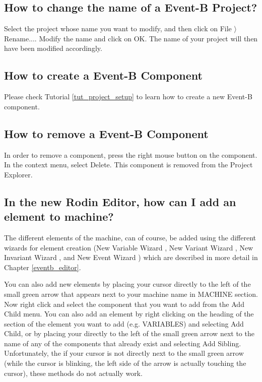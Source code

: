 \subsection{How to change the name of a Event-B Project?}

Select the project whose name you want to modify, and then click on \textsf{File $\rangle$ Rename...}. Modify the name and click on \textsf{OK}. The name of your project will then have been modified accordingly. 

\subsection{How to create a Event-B Component}

Please check Tutorial \ref{tut_project_setup} to learn how to create a new Event-B component.

\subsection{How to remove a Event-B Component}

In order to remove a component, press the right mouse button on the component. In the context menu, select \textsf{Delete}. This component is removed from the \textsf{Project Explorer}. 

\subsection{In the new Rodin Editor, how can I add an element to machine?}

The different elements of the machine, can of course, be added using the different wizards for element creation (New Variable Wizard , New Variant Wizard , New Invariant Wizard , and New Event Wizard ) which are described in more detail in Chapter \ref{eventb_editor}. 

You can also add new elements by placing your cursor directly to the left of the small green arrow that appears next to your machine name in \textsf{MACHINE} section. Now right click and select the component that you want to add from the \textsf{Add Child} menu. You can also add an element by right clicking on the heading of the section of the element you want to add (e.g. \textsf{VARIABLES}) and selecting \textsf{Add Child}, or by placing your directly to the left of the small green arrow next to the name of any of the components that already exist and selecting \textsf{Add Sibling}. Unfortunately, the if your cursor is not directly next to the small green arrow (while the cursor is blinking, the left side of the arrow is actually touching the cursor), these methods do not actually work. 

